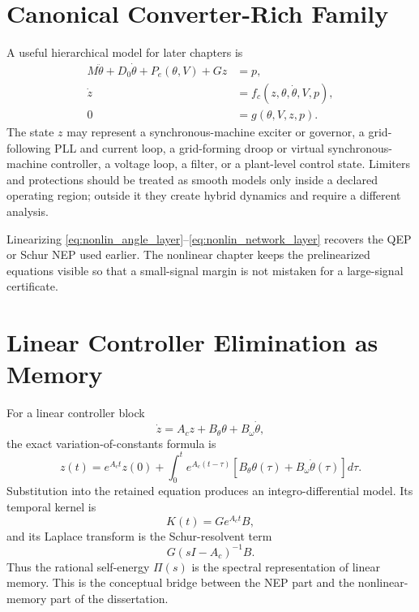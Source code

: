 \section{Canonical Converter-Rich Family}

A useful hierarchical model for later chapters is
\begin{align}
  M\ddot\theta+D_0\dot\theta+P_e(\theta,V)+Gz &= p, \label{eq:nonlin_angle_layer}\\
  \dot z &= f_c(z,\theta,\dot\theta,V,p), \label{eq:nonlin_control_layer}\\
  0 &= g(\theta,V,z,p). \label{eq:nonlin_network_layer}
\end{align}
The state \(z\) may represent a synchronous-machine exciter or governor, a
grid-following PLL and current loop, a grid-forming droop or virtual
synchronous-machine controller, a voltage loop, a filter, or a plant-level
control state. Limiters and protections should be treated as smooth models
only inside a declared operating region; outside it they create hybrid
dynamics and require a different analysis.

Linearizing \eqref{eq:nonlin_angle_layer}--\eqref{eq:nonlin_network_layer}
recovers the QEP or Schur NEP used earlier. The nonlinear chapter keeps the
prelinearized equations visible so that a small-signal margin is not mistaken
for a large-signal certificate.

\section{Linear Controller Elimination as Memory}

For a linear controller block
\begin{equation}
  \dot z=A_cz+B_\theta\theta+B_\omega\dot\theta,
  \label{eq:nonlin_linear_controller}
\end{equation}
the exact variation-of-constants formula is
\begin{equation}
  z(t)
  =
  e^{A_ct}z(0)
  +
  \int_0^t
  e^{A_c(t-\tau)}
  \left[
  B_\theta\theta(\tau)+B_\omega\dot\theta(\tau)
  \right]d\tau .
  \label{eq:nonlin_linear_memory}
\end{equation}
Substitution into the retained equation produces an integro-differential
model. Its temporal kernel is
\begin{equation}
  K(t)=Ge^{A_ct}B,
  \label{eq:nonlin_memory_kernel}
\end{equation}
and its Laplace transform is the Schur-resolvent term
\begin{equation}
  G(sI-A_c)^{-1}B.
  \label{eq:nonlin_memory_transform}
\end{equation}
Thus the rational self-energy \(\Pi(s)\) is the spectral representation of
linear memory. This is the conceptual bridge between the NEP part and the
nonlinear-memory part of the dissertation.

